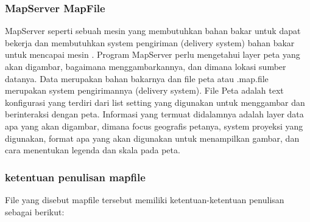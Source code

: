 	\subsubsection {MapServer MapFile}
		MapServer seperti sebuah mesin yang membutuhkan bahan bakar untuk dapat bekerja dan membutuhkan system pengiriman (delivery system) bahan bakar untuk mencapai mesin . 
		Program MapServer perlu mengetahui layer peta yang akan digambar, bagaimana menggambarkannya, dan dimana lokasi sumber datanya. 
		Data merupakan bahan bakarnya dan file peta atau .map.file merupakan system pengirimannya (delivery system). 
		File Peta adalah text konfigurasi yang terdiri dari list setting yang digunakan untuk menggambar dan berinteraksi dengan peta. 
		Informasi yang termuat didalamnya adalah layer data apa yang akan digambar, dimana focus geografis petanya, system proyeksi yang digunakan, 
		format apa yang akan digunakan untuk menampilkan gambar, dan cara menentukan legenda dan skala pada peta.
		
	\subsubsection{ketentuan penulisan mapfile}
		File yang disebut mapfile tersebut memiliki ketentuan-ketentuan penulisan sebagai berikut:


